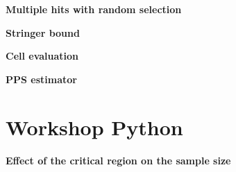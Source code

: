 \begin{exercise}
\label{ex:double_hits}

\textbf{Multiple hits with random selection}





\end{exercise}

\begin{exercise}
\label{ex:stringer_bound}

\textbf{Stringer bound}









\end{exercise}

\begin{exercise}
\label{ex:cell_evaluation}

\textbf{Cell evaluation}



\end{exercise}

\begin{exercise}
\label{ex:pps_estimate}

\textbf{PPS estimator}




\end{exercise}


\section{Workshop Python} %
\label{sec:workshop05_python}

\begin{exercise}
\label{ex:critical_region_p}

\textbf{Effect of the critical region on the sample size}





\end{exercise}

